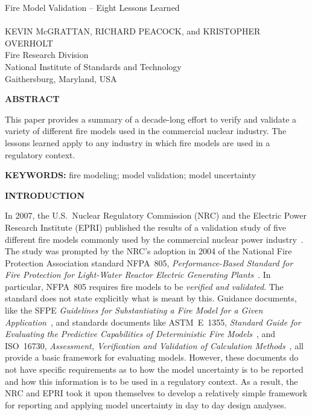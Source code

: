 \documentclass[fleqn,b5paper]{article}
\begin{document}
\renewcommand{\thefootnote}{\sf \arabic{footnote}}
\renewcommand{\d}{\mathrm{d}}
\renewcommand{\labelitemi}{{\scriptsize $\bullet$}}
\renewcommand{\labelitemii}{{\scriptsize $\bullet$}}




\begin{flushleft}
{\helvb Fire Model Validation -- Eight Lessons Learned}\\
\hspace{1in}\\
\helvn KEVIN McGRATTAN\footnotemark[1], RICHARD PEACOCK\footnotemark[1], and KRISTOPHER OVERHOLT\footnotemark[1]  \\
\footnotemark[1] Fire Research Division \\
National Institute of Standards and Technology \\
Gaithersburg, Maryland, USA
\end{flushleft}
\rm

\vspace{\parskip}
{\bf ABSTRACT}

This paper provides a summary of a decade-long effort to verify and validate a variety of different fire models used in the commercial nuclear industry. The lessons learned apply to any industry in which fire models are used in a regulatory context. 

\vspace{\parskip}
{\bf KEYWORDS:} fire modeling; model validation; model uncertainty

\vspace{\parskip}
{\bf INTRODUCTION}

In 2007, the U.S.~Nuclear Regulatory Commission (NRC) and the Electric Power Research Institute (EPRI) published the results of a validation study of five different fire models commonly used by the commercial nuclear power industry~\cite{NUREG_1824}. The study was prompted by the NRC's adoption in 2004 of the National Fire Protection Association standard NFPA~805, {\em Performance-Based Standard for Fire Protection for Light-Water Reactor Electric Generating Plants}~\cite{NFPA_805}. In particular, NFPA~805 requires fire models to be {\em verified and validated}. The standard does not state explicitly what is meant by this. Guidance documents, like the SFPE {\em Guidelines for Substantiating a Fire Model for a Given Application}~\cite{SFPE_G.06}, and standards documents like ASTM~E~1355, {\em Standard Guide for Evaluating the Predictive Capabilities of Deterministic Fire Models}~\cite{ASTM:E1355}, and ISO~16730, {\em Assessment, Verification and Validation of Calculation Methods}~\cite{ISO16730}, all provide a basic framework for evaluating models. However, these documents do not have specific requirements as to how the model uncertainty is to be reported and how this information is to be used in a regulatory context. As a result, the NRC and EPRI took it upon themselves to develop a relatively simple framework for reporting and applying model uncertainty in day to day design analyses.
\end{document}

